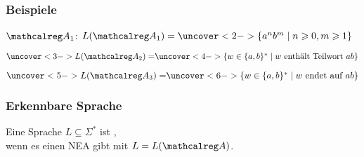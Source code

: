     \begin{frame}
      \frametitle{Beispiele}
      \label{frame:automatenbsp}
      
      \begin{exampleblock}{}
        $\Aut{A}_1$:\quad {} 
        \hfill
        $L(\Aut{A}_1) = \uncover<2->{\{a^nb^m \mid n \geqslant 0, m \geqslant 1\}}$

        \par\bigskip
        \par\bigskip
        $\uncover<3->{L(\Aut{A}_2) = }\uncover<4->{\{w \in \{a,b\}^* \mid \text{$w$ enthält Teilwort $ab$}\}}$

        \par\bigskip
        \par\bigskip
        $\uncover<5->{L(\Aut{A}_3) = }\uncover<6->{\{w \in \{a,b\}^* \mid \text{$w$ endet auf $ab$}\}}$
      \end{exampleblock}

    \end{frame}

    \begin{frame}
      \frametitle{Erkennbare Sprache}
      
      \begin{Definition}
        Eine Sprache $L \subseteq \Sigma^*$ ist , \\
        wenn es einen NEA  gibt mit $L = L(\Aut{A})$.
      \end{Definition}

    \end{frame}

